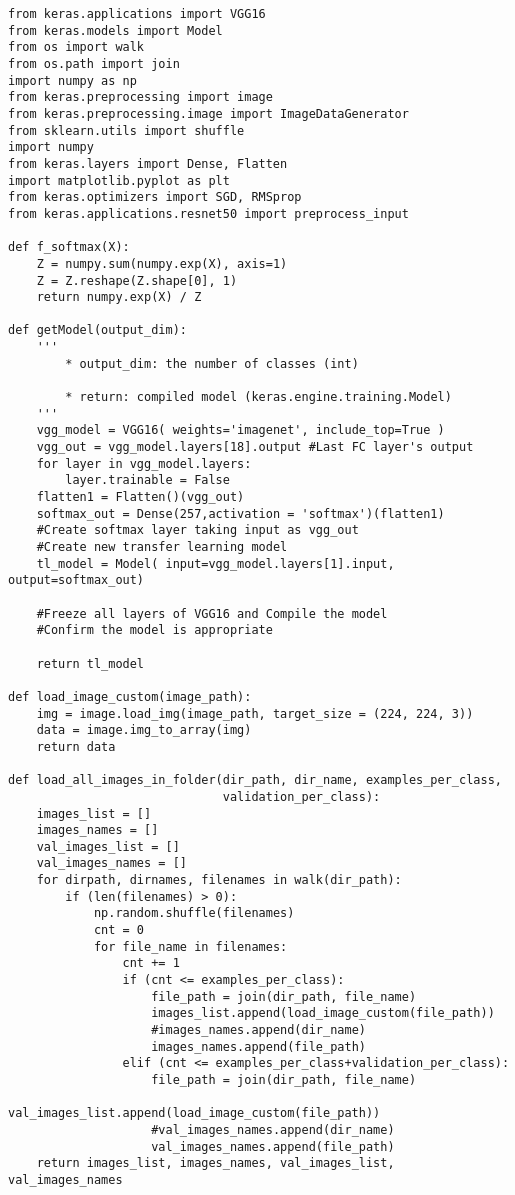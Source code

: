 \documentclass{article}
\begin{document}
\begin{lstlisting}
from keras.applications import VGG16
from keras.models import Model
from os import walk
from os.path import join
import numpy as np
from keras.preprocessing import image
from keras.preprocessing.image import ImageDataGenerator
from sklearn.utils import shuffle
import numpy
from keras.layers import Dense, Flatten
import matplotlib.pyplot as plt
from keras.optimizers import SGD, RMSprop
from keras.applications.resnet50 import preprocess_input 

def f_softmax(X):
    Z = numpy.sum(numpy.exp(X), axis=1)
    Z = Z.reshape(Z.shape[0], 1)
    return numpy.exp(X) / Z

def getModel(output_dim):
    ''' 
        * output_dim: the number of classes (int)
        
        * return: compiled model (keras.engine.training.Model)
    '''
    vgg_model = VGG16( weights='imagenet', include_top=True )
    vgg_out = vgg_model.layers[18].output #Last FC layer's output  
    for layer in vgg_model.layers:
        layer.trainable = False
    flatten1 = Flatten()(vgg_out)
    softmax_out = Dense(257,activation = 'softmax')(flatten1) 
    #Create softmax layer taking input as vgg_out
    #Create new transfer learning model
    tl_model = Model( input=vgg_model.layers[1].input, output=softmax_out)

    #Freeze all layers of VGG16 and Compile the model
    #Confirm the model is appropriate

    return tl_model

def load_image_custom(image_path):
    img = image.load_img(image_path, target_size = (224, 224, 3))
    data = image.img_to_array(img)
    return data

def load_all_images_in_folder(dir_path, dir_name, examples_per_class, 
                              validation_per_class):
    images_list = []
    images_names = []
    val_images_list = []
    val_images_names = []
    for dirpath, dirnames, filenames in walk(dir_path):
        if (len(filenames) > 0):
            np.random.shuffle(filenames)
            cnt = 0
            for file_name in filenames:
                cnt += 1
                if (cnt <= examples_per_class):
                    file_path = join(dir_path, file_name)
                    images_list.append(load_image_custom(file_path))
                    #images_names.append(dir_name)
                    images_names.append(file_path)
                elif (cnt <= examples_per_class+validation_per_class):
                    file_path = join(dir_path, file_name)
                    val_images_list.append(load_image_custom(file_path))
                    #val_images_names.append(dir_name)
                    val_images_names.append(file_path)
    return images_list, images_names, val_images_list, val_images_names
                

\end{lstlisting}
\end{document}
